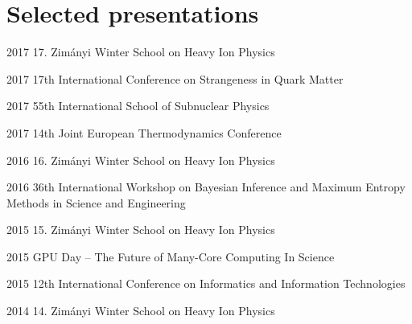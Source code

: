 \documentclass{tccv}
\begin{document}
%
%
%

\section{Selected presentations}

\begin{presentationlist}

\item{2017}
{17. Zimányi Winter School on Heavy Ion Physics}

\item{2017}
{17th International Conference on Strangeness in Quark Matter}

\item{2017}
{55th International School of Subnuclear Physics}

\item{2017}
{14th Joint European Thermodynamics Conference}

\item{2016}
{16. Zimányi Winter School on Heavy Ion Physics}

\item{2016}
{36th International Workshop on Bayesian Inference and Maximum Entropy Methods in Science and Engineering}
   
\item{2015}
{15. Zimányi Winter School on Heavy Ion Physics}

\item{2015}
{GPU Day -- The Future of Many-Core Computing In Science}


\item{2015}
{12th International Conference on Informatics and Information Technologies}

\item{2014}
{14. Zimányi Winter School on Heavy Ion Physics}

\end{presentationlist}
\end{document}

